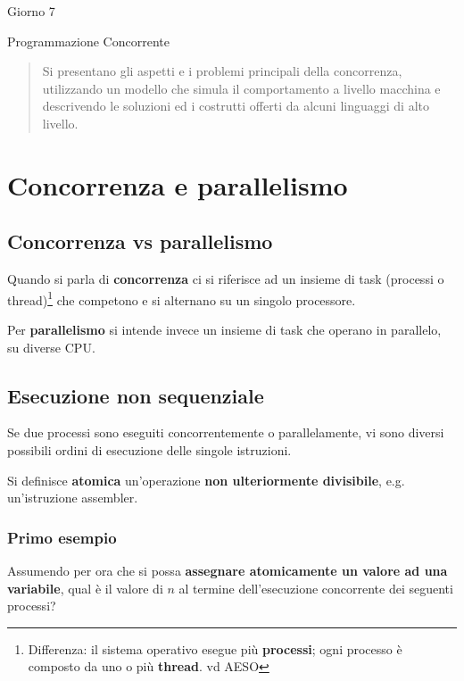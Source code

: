 \documentclass[a4paper,10pt]{article}
\begin{document}
\begin{center}
    \LARGE Giorno 7\smallskip

    \Large Programmazione Concorrente
\end{center}\smallskip

\begin{abstract}
 Si presentano gli aspetti e i problemi principali della concorrenza, utilizzando un modello che simula il comportamento a livello macchina e descrivendo le soluzioni ed i costrutti offerti da alcuni linguaggi di alto livello.
\end{abstract}

\section{Concorrenza e parallelismo}
\subsection{Concorrenza vs parallelismo}
Quando si parla di \textbf{concorrenza} ci si riferisce ad un insieme di task (processi o thread)\footnote{Differenza: il sistema operativo esegue più \textbf{processi}; ogni processo è composto da uno o più \textbf{thread}. vd AESO} che competono e si alternano su un singolo processore.\smallskip

Per \textbf{parallelismo} si intende invece un insieme di task che operano in parallelo, su diverse CPU.

\subsection{Esecuzione non sequenziale}
Se due processi sono eseguiti concorrentemente o parallelamente, vi sono diversi possibili ordini di esecuzione delle singole istruzioni.\smallskip

Si definisce \textbf{atomica} un'operazione \textbf{non ulteriormente divisibile}, e.g. un'istruzione assembler.

\subsubsection{Primo esempio}
Assumendo per ora che si possa \textbf{assegnare atomicamente un valore ad una variabile}, qual è il valore di $n$ al termine dell'esecuzione concorrente dei seguenti processi?\smallskip
\end{document}

